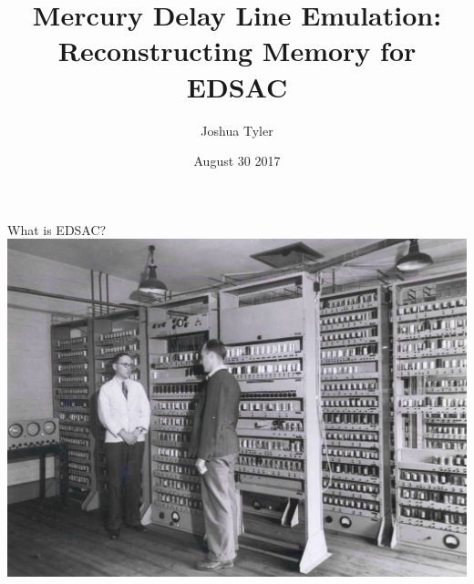 \documentclass[aspectratio=169,11pt, xcolor={table}]{beamer}
\title{\huge Mercury Delay Line Emulation:\\Reconstructing Memory for EDSAC}
\date{August 30 2017}
\author{{\large Joshua Tyler}}
\begin{document}
\maketitle

\begin{frame}{What is EDSAC?}
	\centering
	\includegraphics[height=0.8\textheight]{figs/wilkes_renwick_edsac_crop}
\end{frame}
\end{document}
